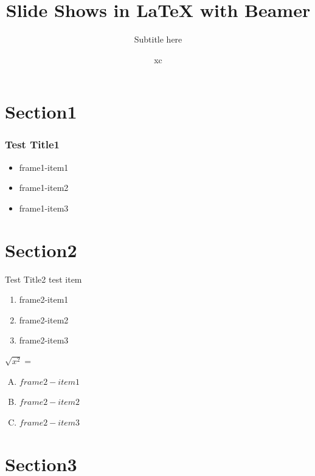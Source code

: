 \documentclass{beamer}
\title[short title]{Slide Shows in {\LaTeX} with Beamer}
\subtitle{Subtitle here}
\author{xc}
\institute{\large \textbf{Institute}: \\[6pt] word before is large and bold}
\begin{document}

\maketitle

\section{Section1}

\begin{frame}
    \frametitle{Test Title1}
    \titlepage
    \begin{itemize}
        \item frame1-item1\pause
        \item frame1-item2\pause
        \item frame1-item3
    \end{itemize}
\end{frame}

\section{Section2}

\begin{frame}[t]{Test Title2}\vspace{20pt}
    test item\pause
    \begin{enumerate}
        \item frame2-item1\pause
        \item frame2-item2\pause
        \item frame2-item3\pause
    \end{enumerate}
    \vspace{0.5em}
    $\sqrt{x^2}=$\\[10pt] %
    \begin{enumerate}[(A)]
        \item $frame2-item1$
        \item $frame2-item2$
        \item $frame2-item3$
    \end{enumerate}
\end{frame}

\section{Section3}
\end{document}

